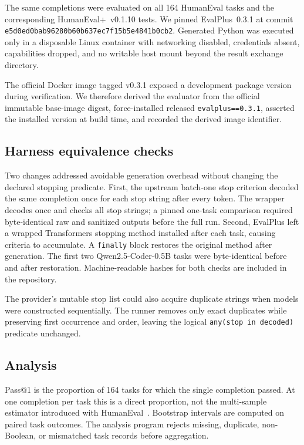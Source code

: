 \documentclass[10pt,twocolumn]{article}
\newcommand{\code}[1]{\texttt{#1}}
\begin{document}
The same completions were evaluated on all 164 HumanEval tasks and the corresponding HumanEval+~v0.1.10 tests. We pinned EvalPlus~0.3.1 at commit \code{e5d0ed0bab96280b60b637ec7f15b5e4841b0cb2}. Generated Python was executed only in a disposable Linux container with networking disabled, credentials absent, capabilities dropped, and no writable host mount beyond the result exchange directory.

The official Docker image tagged v0.3.1 exposed a development package version during verification. We therefore derived the evaluator from the official immutable base-image digest, force-installed released \code{evalplus==0.3.1}, asserted the installed version at build time, and recorded the derived image identifier.

\subsection{Harness equivalence checks}

Two changes addressed avoidable generation overhead without changing the declared stopping predicate. First, the upstream batch-one stop criterion decoded the same completion once for each stop string after every token. The wrapper decodes once and checks all stop strings; a pinned one-task comparison required byte-identical raw and sanitized outputs before the full run. Second, EvalPlus left a wrapped Transformers stopping method installed after each task, causing criteria to accumulate. A \code{finally} block restores the original method after generation. The first two Qwen2.5-Coder-0.5B tasks were byte-identical before and after restoration. Machine-readable hashes for both checks are included in the repository.

The provider's mutable stop list could also acquire duplicate strings when models were constructed sequentially. The runner removes only exact duplicates while preserving first occurrence and order, leaving the logical \code{any(stop in decoded)} predicate unchanged.

\subsection{Analysis}

Pass@1 is the proportion of 164 tasks for which the single completion passed. At one completion per task this is a direct proportion, not the multi-sample estimator introduced with HumanEval~\citep{chen2021humaneval}. Bootstrap intervals are computed on paired task outcomes. The analysis program rejects missing, duplicate, non-Boolean, or mismatched task records before aggregation.
\end{document}
